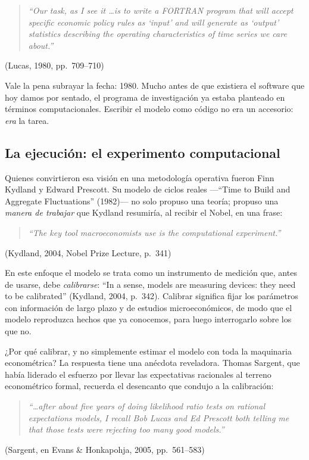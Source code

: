 \documentclass[11pt,a4paper]{report}
\begin{document}
\begin{quote}\itshape
``Our task, as I see it \ldots is to write a FORTRAN program that will accept
specific economic policy rules as `input' and will generate as `output'
statistics describing the operating characteristics of time series we care
about.''
\end{quote}
\hfill{\small(Lucas, 1980, pp.~709--710)}

\noindent Vale la pena subrayar la fecha: 1980. Mucho antes de que existiera el
software que hoy damos por sentado, el programa de investigación ya estaba
planteado en términos computacionales. Escribir el modelo como código no era un
accesorio: \emph{era} la tarea.

\subsection{La ejecución: el experimento computacional}

Quienes convirtieron esa visión en una metodología operativa fueron Finn
Kydland y Edward Prescott. Su modelo de ciclos reales ---``Time to Build and
Aggregate Fluctuations'' (1982)--- no solo propuso una teoría; propuso una
\emph{manera de trabajar} que Kydland resumiría, al recibir el Nobel, en una
frase:

\begin{quote}\itshape
``The key tool macroeconomists use is the computational experiment.''
\end{quote}
\hfill{\small(Kydland, 2004, Nobel Prize Lecture, p.~341)}

\noindent En este enfoque el modelo se trata como un instrumento de medición
que, antes de usarse, debe \emph{calibrarse}: ``In a sense, models are measuring
devices: they need to be calibrated'' (Kydland, 2004, p.~342). Calibrar
significa fijar los parámetros con información de largo plazo y de estudios
microeconómicos, de modo que el modelo reproduzca hechos que ya conocemos,
para luego interrogarlo sobre los que no.

¿Por qué calibrar, y no simplemente estimar el modelo con toda la maquinaria
econométrica? La respuesta tiene una anécdota reveladora. Thomas Sargent, que
había liderado el esfuerzo por llevar las expectativas racionales al terreno
econométrico formal, recuerda el desencanto que condujo a la calibración:

\begin{quote}\itshape
``\ldots after about five years of doing likelihood ratio tests on rational
expectations models, I recall Bob Lucas and Ed Prescott both telling me that
those tests were rejecting too many good models.''
\end{quote}
\hfill{\small(Sargent, en Evans \& Honkapohja, 2005, pp.~561--583)}
\end{document}
